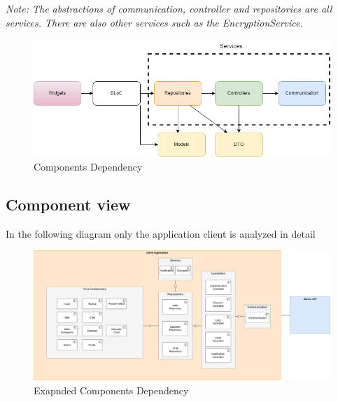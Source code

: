 \documentclass{article}
\begin{document}
\textit{Note: The abstractions of communication, controller and repositories are all services. There are also other services such as the EncryptionService.}


\begin{figure}[ht]
\centering
	\includegraphics[width=1.0\textwidth]{assets/images/package-scheme.png}
	\caption{Components Dependency}
	\label{fig:package-scheme}
\end{figure}

\newpage

\subsection{Component view}
\label{sec:component}
In the following diagram only the application client is analyzed in detail
\begin{figure}[ht]
\centering
	\includegraphics[width=1.0\textwidth]{assets/images/component-view.png}
	\caption{Exapnded Components Dependency}
	\label{fig:component-view}
\end{figure}
\end{document}
